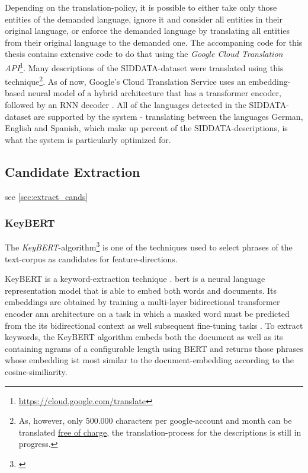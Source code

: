 Depending on the translation-policy, it is possible to either take only those entities of the demanded language, ignore it and consider all entities in their original language, or enforce the demanded language by translating all entities from their original language to the demanded one. The accompaning code for this thesis contains extensive code to do that using the \emph{Google Cloud Translation API}\footnote{\url{https://cloud.google.com/translate}}. Many descriptions of the SIDDATA-dataset were translated using this technique\footnote{As, however, only 500.000 characters per google-account and month can be translated \href{https://cloud.google.com/translate/pricing}{free of charge}, the translation-process for the descriptions is still in progress.}. As of now, Google's Cloud Translation Service uses an embedding-based neural model of a hybrid architecture that has a transformer encoder, followed by an RNN decoder \cite{Chen2018}. All of the languages detected in the SIDDATA-dataset are supported by the system - translating between the languages German, English and Spanish, which make up  percent of the SIDDATA-descriptions, is what the system is particularly optimized for. 


\subsection*{Candidate Extraction}

see \autoref{sec:extract_cands}

\subsubsection*{KeyBERT}
\label{ap:details_keybert}

The \emph{KeyBERT}-algorithm\footnote{\label{fnote:keybertgibhut}} \cite{grootendorst2020keybert} is one of the techniques used to select phrases of the text-corpus as candidates for \gls{feature}-directions. 

KeyBERT is a keyword-extraction technique . \Gls{bert} is a neural language representation model that is able to embed both words and documents. Its embeddings are obtained by training a multi-layer bidirectional transformer encoder \gls{ann} architecture on a task in which a masked word must be predicted from the its bidirectional context as well subsequent fine-tuning tasks \cite{Devlin2019}. To extract keywords, the KeyBERT algorithm embeds both the document as well as its containing \glspl{ngram} of a configurable length using BERT and returns those phrases whose embedding ist most similar to the document-embedding according to the cosine-similiarity.

